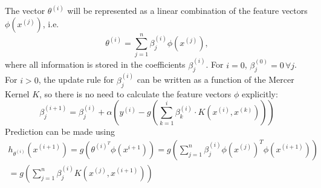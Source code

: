 \begin{answer}
The vector $\theta^{(i)}$ will be represented as a linear combination of the feature vectors $\phi(x^{(j)})$, i.e.
\begin{equation*}
    \theta^{(i)} = \sum_{j=1}^{n} \beta_j^{(i)}\phi(x^{(j)}),
\end{equation*}
where all information is stored in the coefficients $\beta_j^{(i)}$.
For $i=0$, $\beta_j^{(0)}=0\,\forall j$.
For $i>0$, the update rule for $\beta_j^{(i)}$ can be written as a function of the Mercer Kernel $K$, so there is no need to calculate
the feature vectors $\phi$ explicitly:
\begin{equation*}
    \beta_j^{(i+1)} = \beta_j^{(i)} + \alpha \left( y^{(i)} - g\left(\sum_{k=1}^i \beta_k^{(i)}\cdot K\left(x^{(i)}, x^{(k)}\right)\right)\right)
\end{equation*}
Prediction can be made using
\begin{align*}
    h_{\theta^{(i)}}(x^{(i+1)}) = g(\theta^{(i)^T} \phi(x^{i+1}))
     = g \left(\sum_{j=1}^{n} \beta_j^{(i)}{\phi(x^{(j)})^T} \phi(x^{(i+1)}) \right) \\
     = g \left(\sum_{j=1}^{n} \beta_j^{(i)} K\left( x^{(j)}, x^{(i+1)}\right) \right)
\end{align*}
\end{answer}
